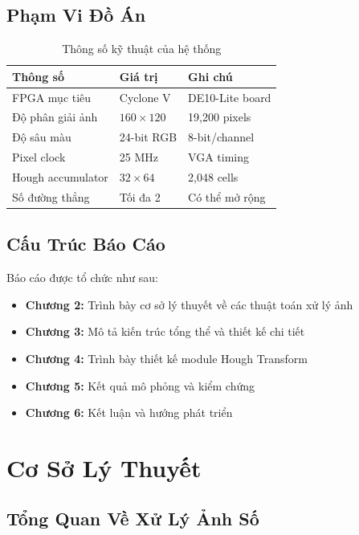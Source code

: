 \documentclass[12pt,a4paper]{report}
\begin{document}
\section{Phạm Vi Đồ Án}

\begin{table}[H]
\centering
\caption{Thông số kỹ thuật của hệ thống}
\label{tab:specs}
\begin{tabular}{|l|l|l|}
\hline
\textbf{Thông số} & \textbf{Giá trị} & \textbf{Ghi chú} \\
\hline
FPGA mục tiêu & Cyclone V & DE10-Lite board \\
Độ phân giải ảnh & $160 \times 120$ & 19,200 pixels \\
Độ sâu màu & 24-bit RGB & 8-bit/channel \\
Pixel clock & 25 MHz & VGA timing \\
Hough accumulator & $32 \times 64$ & 2,048 cells \\
Số đường thẳng & Tối đa 2 & Có thể mở rộng \\
\hline
\end{tabular}
\end{table}

\section{Cấu Trúc Báo Cáo}

Báo cáo được tổ chức như sau:
\begin{itemize}
    \item \textbf{Chương 2:} Trình bày cơ sở lý thuyết về các thuật toán xử lý ảnh
    \item \textbf{Chương 3:} Mô tả kiến trúc tổng thể và thiết kế chi tiết
    \item \textbf{Chương 4:} Trình bày thiết kế module Hough Transform
    \item \textbf{Chương 5:} Kết quả mô phỏng và kiểm chứng
    \item \textbf{Chương 6:} Kết luận và hướng phát triển
\end{itemize}

\chapter{Cơ Sở Lý Thuyết}

\section{Tổng Quan Về Xử Lý Ảnh Số}
\end{document}
